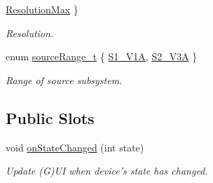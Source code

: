 \begin{DoxyCompactItemize}
\hyperlink{classmdt_device_u3606_a_a1899206163f2a0163d09cbc482daf806a82c71d88404eb70e505cbce753aaf06f}{Resolution\-Max}
 \}
\begin{DoxyCompactList}\small\item\em Resolution. \end{DoxyCompactList}\item 
enum \hyperlink{classmdt_device_u3606_a_af53b326fef5d9e32a0149839b4319b1e}{source\-Range\-\_\-t} \{ \hyperlink{classmdt_device_u3606_a_af53b326fef5d9e32a0149839b4319b1ea8334e412fd9c1d2140c59bf9404cb426}{S1\-\_\-V1\-A}, 
\hyperlink{classmdt_device_u3606_a_af53b326fef5d9e32a0149839b4319b1ea0b765326b086f0d41b18e58f358e14ad}{S2\-\_\-V3\-A}
 \}
\begin{DoxyCompactList}\small\item\em Range of source subsystem. \end{DoxyCompactList}\end{DoxyCompactItemize}
\subsection*{Public Slots}
\begin{DoxyCompactItemize}
\item 
void \hyperlink{classmdt_device_u3606_a_a94a6f8b3f64cd35b33204c66816f3f6a}{on\-State\-Changed} (int state)
\begin{DoxyCompactList}\small\item\em Update (G)U\-I when device's state has changed. \end{DoxyCompactList}\end{DoxyCompactItemize}
